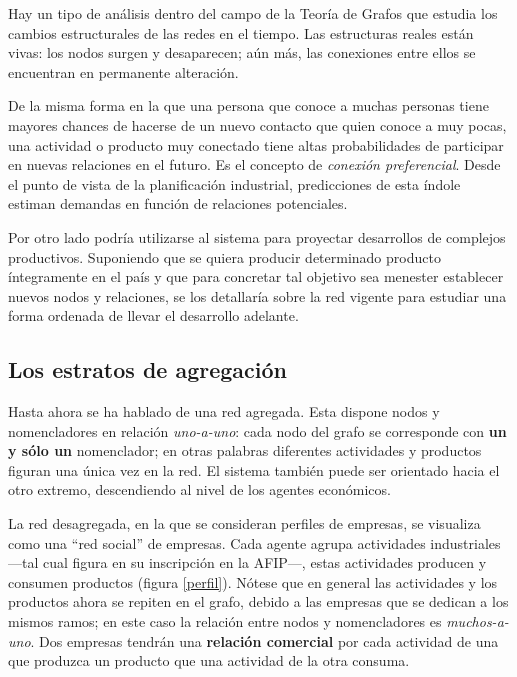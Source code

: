 \documentclass[a4paper]{report}
\begin{document}
Hay un tipo de análisis dentro del campo de la Teoría de Grafos que estudia los cambios estructurales de las redes en el tiempo. Las estructuras reales están vivas: los nodos surgen y desaparecen; aún más, las conexiones entre ellos se encuentran en permanente alteración.

De la misma forma en la que una persona que conoce a muchas personas tiene mayores chances de hacerse de un nuevo contacto que quien conoce a muy pocas, una actividad o producto muy conectado tiene altas probabilidades de participar en nuevas relaciones en el futuro. Es el concepto de \textit{conexión preferencial}. Desde el punto de vista de la planificación industrial, predicciones de esta índole estiman demandas en función de relaciones potenciales.

Por otro lado podría utilizarse al sistema para proyectar desarrollos de complejos productivos. Suponiendo que se quiera producir determinado producto íntegramente en el país y que para concretar tal objetivo sea menester establecer nuevos nodos y relaciones, se los detallaría sobre la red vigente para estudiar una forma ordenada de llevar el desarrollo adelante.

\subsection*{Los estratos de agregación}

Hasta ahora se ha hablado de una red agregada. Esta dispone nodos y nomencladores en relación \textit{uno-a-uno}: cada nodo del grafo se corresponde con \textbf{un y sólo un} nomenclador; en otras palabras diferentes actividades y productos figuran una única vez en la red. El sistema también puede ser orientado hacia el otro extremo, descendiendo al nivel de los agentes económicos.

La red desagregada, en la que se consideran perfiles de empresas, se visualiza como una ``red social'' de empresas. Cada agente agrupa actividades industriales —tal cual figura en su inscripción en la AFIP—, estas actividades producen y consumen productos (figura \ref{perfil}). Nótese que en general las actividades y los productos ahora se repiten en el grafo, debido a las empresas que se dedican a los mismos ramos; en este caso la relación entre nodos y nomencladores es \textit{muchos-a-uno}. Dos empresas tendrán una \textbf{relación comercial} por cada actividad de una que produzca un producto que una actividad de la otra consuma.
\end{document}
